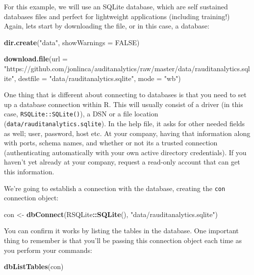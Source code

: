 \documentclass[
]{book}
\newenvironment{Shaded}{\begin{snugshade}}{\end{snugshade}}
\newcommand{\DataTypeTok}[1]{\textcolor[rgb]{0.13,0.29,0.53}{#1}}
\newcommand{\KeywordTok}[1]{\textcolor[rgb]{0.13,0.29,0.53}{\textbf{#1}}}
\newcommand{\NormalTok}[1]{#1}
\newcommand{\OperatorTok}[1]{\textcolor[rgb]{0.81,0.36,0.00}{\textbf{#1}}}
\newcommand{\OtherTok}[1]{\textcolor[rgb]{0.56,0.35,0.01}{#1}}
\newcommand{\StringTok}[1]{\textcolor[rgb]{0.31,0.60,0.02}{#1}}
\begin{document}
For this example, we will use an SQLite database, which are self sustained databases files and perfect for lightweight applications (including training!) Again, lets start by downloading the file, or in this case, a database:

\begin{Shaded}
\begin{Highlighting}[]
\KeywordTok{dir.create}\NormalTok{(}\StringTok{"data"}\NormalTok{, }\DataTypeTok{showWarnings =} \OtherTok{FALSE}\NormalTok{)}

\KeywordTok{download.file}\NormalTok{(}\DataTypeTok{url =} \StringTok{"https://github.com/jonlinca/auditanalytics/raw/master/data/rauditanalytics.sqlite"}\NormalTok{,}
             \DataTypeTok{destfile =} \StringTok{"data/rauditanalytics.sqlite"}\NormalTok{, }\DataTypeTok{mode =} \StringTok{"wb"}\NormalTok{)}
\end{Highlighting}
\end{Shaded}

One thing that is different about connecting to databases is that you need to set up a database connection within R. This will usually consist of a driver (in this case, \texttt{RSQLite::SQLite()}), a DSN or a file location (\texttt{data/rauditanalytics.sqlite}). In the help file, it asks for other needed fields as well; user, password, host etc. At your company, having that information along with ports, schema names, and whether or not its a trusted connection (authenticating automatically with your own active directory credentials). If you haven't yet already at your company, request a read-only account that can get this information.

We're going to establish a connection with the database, creating the \texttt{con} connection object:

\begin{Shaded}
\begin{Highlighting}[]
\NormalTok{con <-}\StringTok{ }\KeywordTok{dbConnect}\NormalTok{(RSQLite}\OperatorTok{::}\KeywordTok{SQLite}\NormalTok{(), }\StringTok{"data/rauditanalytics.sqlite"}\NormalTok{)}
\end{Highlighting}
\end{Shaded}

You can confirm it works by listing the tables in the database. One important thing to remember is that you'll be passing this connection object each time as you perform your commands:

\begin{Shaded}
\begin{Highlighting}[]
\KeywordTok{dbListTables}\NormalTok{(con)}
\end{Highlighting}
\end{Shaded}
\end{document}
